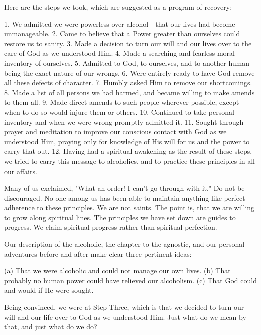 \begin{biblechapter}
    Here are the steps we took, 
    which are suggested as a program of recovery:

1. We admitted we were powerless over alcohol - that our lives had become unmanageable.
2. Came to believe that a Power greater than ourselves could restore us to sanity.
3. Made a decision to turn our will and our lives over to the care of God as we understood Him.
4. Made a searching and fearless moral inventory of ourselves.
5. Admitted to God, to ourselves, and to another human being the exact nature of our wrongs.
6. Were entirely ready to have God remove all these defects of character.
7. Humbly asked Him to remove our shortcomings.
8. Made a list of all persons we had harmed, and became willing to make amends to them all.
9. Made direct amends to such people wherever possible, except when to do so would injure them or others.
10. Continued to take personal inventory and when we were wrong promptly admitted it.
11. Sought through prayer and meditation to improve our conscious contact with God as we understood Him, praying only for knowledge of His will for us and the power to carry that out.
12. Having had a spiritual awakening as the result of these steps, we tried to carry this message to alcoholics, and to practice these principles in all our affairs.

Many of us exclaimed, "What an order! I can't go through with it."  Do not be discouraged.  No one among us has been able to maintain anything like perfect adherence to these principles.  We are not saints.  The point is, that we are willing to grow along spiritual lines.  The principles we have set down are guides to progress.  We claim spiritual progress rather than spiritual perfection.

Our description of the alcoholic, the chapter to the agnostic, and our personal adventures before and after make clear three pertinent ideas:

(a) That we were alcoholic and could not manage our own lives.
(b) That probably no human power could have relieved our alcoholism.
(c) That God could and would if He were sought.

Being convinced, we were at Step Three, which is that we decided to turn our will and our life over to God as we understood Him.  Just what do we mean by that, and just what do we do?


\end{biblechapter}
